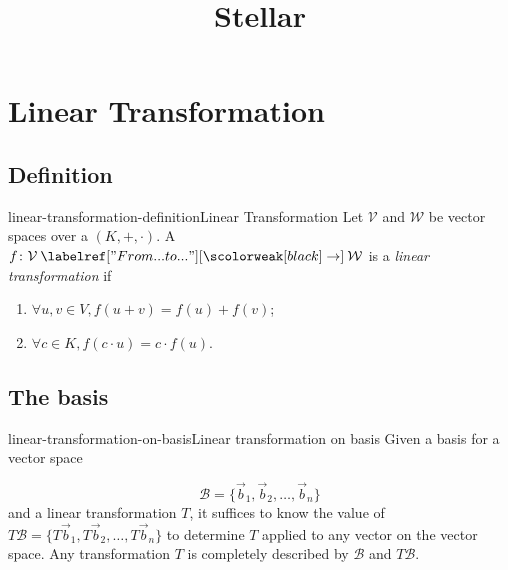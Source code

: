 \documentclass[preview]{standalone}
\begin{document}
\title{Stellar}
\genpage

\section{Linear Transformation}

\subsection{Definition}

\begin{snippetdefinition}{linear-transformation-definition}{Linear Transformation}
    Let \(\mathcal{V}\) and \(\mathcal{W}\) be vector spaces over a \field \((K, +, \cdot)\).
    A \function \(f \colon \mathcal{V} \fromto \mathcal{W}\) is a
    \textit{linear transformation} if
    \begin{enumerate}
        \item \(\forall u,v \in V, f(u + v) = f(u) + f(v)\);
        \item \(\forall c\in K, f(c\cdot u) = c\cdot f(u)\).
    \end{enumerate}
\end{snippetdefinition}

\subsection{The basis}


\begin{snippettheorem}{linear-transformation-on-basis}{Linear transformation on basis}
    Given a basis for a vector space

    \[
        \mathcal{B}=\{\vec{b}_1, \vec{b}_2, \ldots, \vec{b}_n\}
    \]
    and a linear transformation \(T\), it suffices
    to know the value of \(T\mathcal{B}=\{T\vec{b}_1, T\vec{b}_2, \ldots, T\vec{b}_n\}\)
    to determine \(T\) applied to any vector on the vector space.
    Any transformation \(T\) is completely described by \(\mathcal{B}\)
    and \(T\mathcal{B}\).
\end{snippettheorem}
\end{document}

